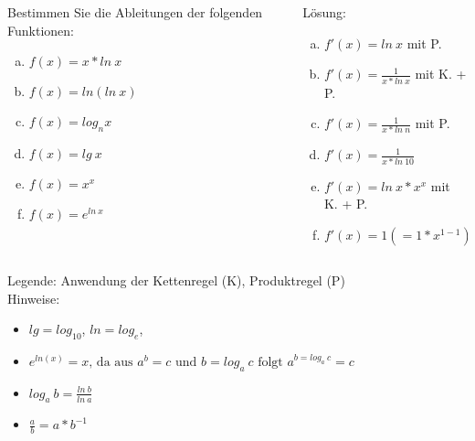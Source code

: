 \begin{card}
	\begin{columns}
		\begin{column}{.5\linewidth}
		Bestimmen Sie die Ableitungen der folgenden Funktionen:
			\begin{enumerate}[a)]
			\item $f(x) = x * ln~x$
			\item $f(x) = ln ( ln~x)$
			\item $f(x) = log_n x$
			\item $f(x) = lg~x$
			\item $f(x) = x^x$
			\item $f(x) = e^{ln~x}$
			\end{enumerate}
		\end{column}
		\begin{column}{.5\linewidth}
		Lösung:
			\begin{enumerate}[a)]
			\item $f'(x) = ln~x$ mit P.
			\item $f'(x) = \frac{1}{x*ln~x}$ mit K. + P.
			\item $f'(x) = \frac{1}{x*ln~n}$ mit P.
			\item $f'(x) = \frac{1}{x*ln~10}$
			\item $f'(x) = ln~x*x^x$ mit K. + P.
			\item $f'(x) = 1 (= 1 * x^{1-1})$
			\end{enumerate}
		\end{column}
	\end{columns}
	\vfill	
	Legende: Anwendung der Kettenregel (K), Produktregel (P)\\
	Hinweise:\\
	\begin{itemize}
	\item $lg = log_{10}$, $ln = log_e$,
	\item $e^{ln(x)} = x \text{, da aus } a^b = c \text{ und } b = log_a~c \text{ folgt } a^{b = log_a~c} = c$
	\item $log_a~b = \frac{ln~b}{ln~a}$
	\item $\frac{a}{b} = a * b^{-1}$
	\end{itemize}
\end{card}

